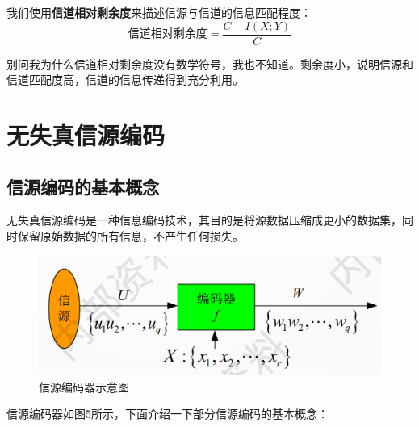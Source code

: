 \documentclass[UTF8,a4paper,11pt]{article}
\begin{document}
我们使用\textbf{信道相对剩余度}来描述信源与信道的信息匹配程度：
\begin{equation}
\text{信道相对剩余度}=\frac{C-I(X;Y)}{C}
\end{equation}

别问我为什么信道相对剩余度没有数学符号，我也不知道。剩余度小，说明信源和信道匹配度高，信道的信息传递得到充分利用。

\section{无失真信源编码}
\subsection{信源编码的基本概念}
无失真信源编码是一种信息编码技术，其目的是将源数据压缩成更小的数据集，同时保留原始数据的所有信息，不产生任何损失。

\begin{figure}[htbp]
\centering
\includegraphics[scale=0.45]{p5.png}
\caption{信源编码器示意图}
\end{figure}

信源编码器如图5所示，下面介绍一下部分信源编码的基本概念：
\end{document}
